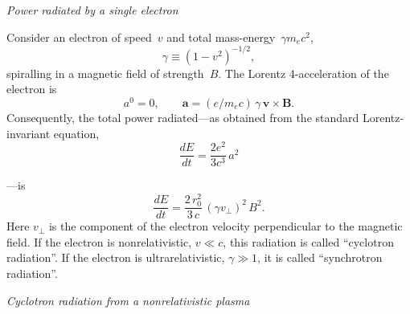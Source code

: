 \bigskip
\noindent\textit{Power radiated by a single electron}

\medskip
Consider an electron of speed~$v$ and total mass-energy~$\gamma m_e c^2$,
\begin{equation}
\gamma \equiv (1 - v^2)^{-1/2},
\tag{2.3.1}
\end{equation}
spiralling in a magnetic field of strength~$B$. The Lorentz 4-acceleration of the
electron is
\begin{equation}
a^0 = 0, \qquad
\mathbf{a} = (e / m_e c)\,\gamma\,\mathbf{v} \times \mathbf{B}.
\tag{2.3.2}
\end{equation}
Consequently, the total power radiated---as obtained from the standard
Lorentz-invariant equation,
\begin{equation}
\frac{dE}{dt} = \frac{2e^2}{3c^3}\,a^2
\tag{2.3.3}
\end{equation}

\noindent---is
\begin{equation}
\frac{dE}{dt} = \frac{2\,r_0^2}{3\,c}\,(\gamma v_\perp)^2\,B^2.
\tag{2.3.4}
\end{equation}
Here $v_\perp$ is the component of the electron velocity perpendicular to the magnetic
field. If the electron is nonrelativistic, $v \ll c$, this radiation is called ``cyclotron
radiation''. If the electron is ultrarelativistic, $\gamma \gg 1$, it is called ``synchrotron
radiation''.

\bigskip
\noindent\textit{Cyclotron radiation from a nonrelativistic plasma}

